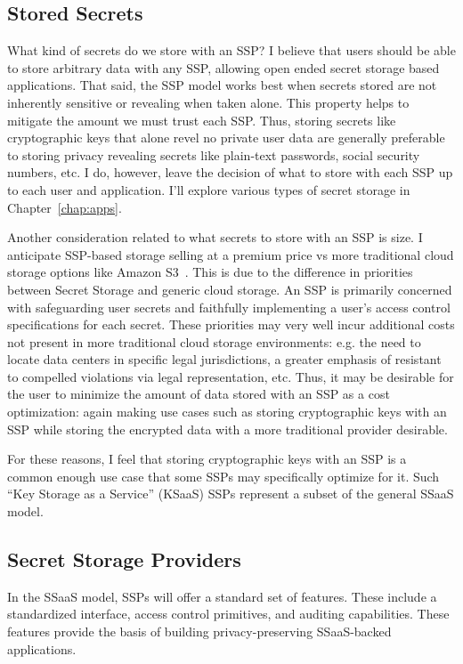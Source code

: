 \subsection{Stored Secrets}

What kind of secrets do we store with an SSP? I believe that users
should be able to store arbitrary data with any SSP, allowing open
ended secret storage based applications. That said, the SSP model
works best when secrets stored are not inherently sensitive or
revealing when taken alone. This property helps to mitigate the amount
we must trust each SSP. Thus, storing secrets like cryptographic keys
that alone revel no private user data are generally preferable to
storing privacy revealing secrets like plain-text passwords, social
security numbers, etc. I do, however, leave the decision of what to
store with each SSP up to each user and application. I'll explore
various types of secret storage in Chapter~\ref{chap:apps}.

Another consideration related to what secrets to store with an SSP is
size. I anticipate SSP-based storage selling at a premium price vs
more traditional cloud storage options like Amazon
S3~\cite{amazon-s3}. This is due to the difference in priorities
between Secret Storage and generic cloud storage. An SSP is primarily
concerned with safeguarding user secrets and faithfully implementing a
user's access control specifications for each secret. These priorities
may very well incur additional costs not present in more traditional
cloud storage environments: e.g. the need to locate data centers in
specific legal jurisdictions, a greater emphasis of resistant to
compelled violations via legal representation, etc. Thus, it may be
desirable for the user to minimize the amount of data stored with an
SSP as a cost optimization: again making use cases such as storing
cryptographic keys with an SSP while storing the encrypted data with a
more traditional provider desirable.

For these reasons, I feel that storing cryptographic keys with an SSP
is a common enough use case that some SSPs may specifically optimize
for it. Such ``Key Storage as a Service'' (KSaaS) SSPs represent a
subset of the general SSaaS model.

\subsection{Secret Storage Providers}

In the SSaaS model, SSPs will offer a standard set of features. These
include a standardized interface, access control primitives, and
auditing capabilities. These features provide the basis of building
privacy-preserving SSaaS-backed applications.

